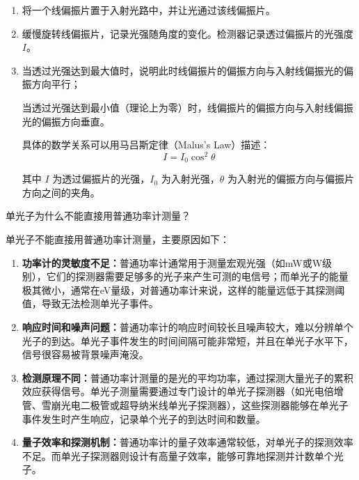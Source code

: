 \documentclass[dvipsnames, svgnames,a4paper,11pt]{article}
\begin{document}
	\begin{enumerate}
		\item 将一个线偏振片置于入射光路中，并让光通过该线偏振片。
		\item 缓慢旋转线偏振片，记录光强随角度的变化。检测器记录透过偏振片的光强度 \( I \)。
		\item 当透过光强达到最大值时，说明此时线偏振片的偏振方向与入射线偏振光的偏振方向平行；
		
		当透过光强达到最小值（理论上为零）时，线偏振片的偏振方向与入射线偏振光的偏振方向垂直。

		具体的数学关系可以用马吕斯定律（Malus's Law）描述：
		\[
			I = I_0 \cos^2 \theta
		\]

		其中 \( I \) 为透过偏振片的光强，\( I_0 \) 为入射光强，\( \theta \) 为入射光的偏振方向与偏振片方向之间的夹角。

	\end{enumerate}


	




\begin{question}
	单光子为什么不能直接用普通功率计测量？
\end{question}

	单光子不能直接用普通功率计测量，主要原因如下：

	\begin{enumerate}
		\item \textbf{功率计的灵敏度不足：}普通功率计通常用于测量宏观光强（如mW或W级别），它们的探测器需要足够多的光子来产生可测的电信号；而单光子的能量极其微小，通常在eV量级，对普通功率计来说，这样的能量远低于其探测阈值，导致无法检测单光子事件。
		\item \textbf{响应时间和噪声问题：}普通功率计的响应时间较长且噪声较大，难以分辨单个光子的到达。单光子事件发生的时间间隔可能非常短，并且在单光子水平下，信号很容易被背景噪声淹没。
		\item \textbf{检测原理不同：}普通功率计测量的是光的平均功率，通过探测大量光子的累积效应获得信号。单光子测量需要通过专门设计的单光子探测器（如光电倍增管、雪崩光电二极管或超导纳米线单光子探测器），这些探测器能够在单光子事件发生时产生响应，记录单个光子的到达时间和数量。
		\item \textbf{量子效率和探测机制：}普通功率计的量子效率通常较低，对单光子的探测效率不足。而单光子探测器则设计有高量子效率，能够可靠地探测并计数单个光子。
	\end{enumerate}
\end{document}

